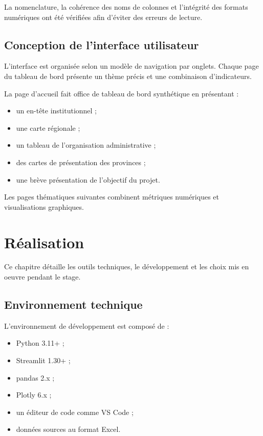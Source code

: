 \documentclass[12pt,a4paper,oneside]{report}
\begin{document}
La nomenclature, la cohérence des noms de colonnes et l'intégrité des formats numériques ont été vérifiées afin d'éviter des erreurs de lecture.

\section{Conception de l'interface utilisateur}

L'interface est organisée selon un modèle de navigation par onglets. Chaque page du tableau de bord présente un thème précis et une combinaison d'indicateurs.

La page d'accueil fait office de tableau de bord synthétique en présentant :

\begin{itemize}[leftmargin=*]
  \item un en-tête institutionnel ;
  \item une carte régionale ;
  \item un tableau de l'organisation administrative ;
  \item des cartes de présentation des provinces ;
  \item une brève présentation de l'objectif du projet.
\end{itemize}

Les pages thématiques suivantes combinent métriques numériques et visualisations graphiques.

\chapter{Réalisation}

Ce chapitre détaille les outils techniques, le développement et les choix mis en oeuvre pendant le stage.

\section{Environnement technique}

L'environnement de développement est composé de :

\begin{itemize}[leftmargin=*]
  \item Python 3.11+ ;
  \item Streamlit 1.30+ ;
  \item pandas 2.x ;
  \item Plotly 6.x ;
  \item un éditeur de code comme VS Code ;
  \item données sources au format Excel.
\end{itemize}
\end{document}
